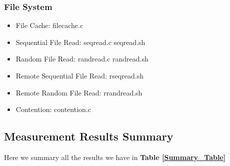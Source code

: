 \subsubsection{File System}
\begin{itemize}
    \item File Cache: filecache.c
    \item Sequential File Read: seqread.c seqread.sh
    \item Random File Read: randread.c randread.sh
    \item Remote Sequential File Read: rseqread.sh
    \item Remote Random File Read: rrandread.sh
    \item Contention: contention.c
\end{itemize}

\subsection{Measurement Results Summary}

Here we summary all the results we have in \textbf{Table \ref{Summary_Table}}

